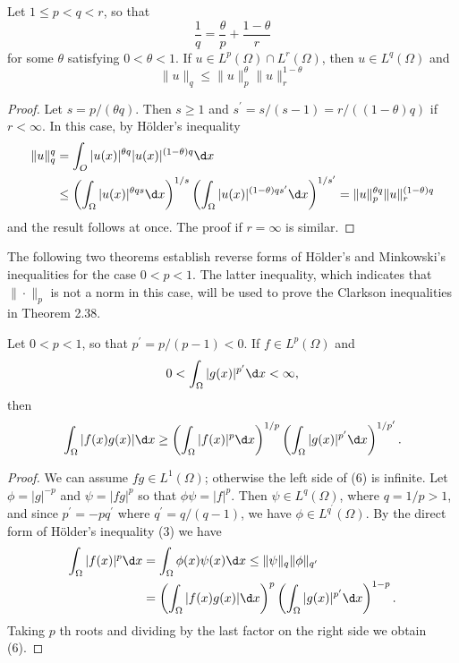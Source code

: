 \begin{theorem}
  Let $1 \leq p<q<r$, so that
  \[
  \frac{1}{q}=\frac{\theta}{p}+\frac{1-\theta}{r}
  \]
  for some $\theta$ satisfying $0<\theta<1$. If $u \in L^p(\Omega) \cap L^r(\Omega)$, then $u \in L^q(\Omega)$ and
  \[
  \|u\|_q \leq\|u\|_p^\theta\|u\|_r^{1-\theta}
  \]
\end{theorem}

\begin{proof}
  Let $s=p /(\theta q)$. Then $s \geq 1$ and $s^{\prime}=s /(s-1)=r /((1-\theta) q)$ if $r<\infty$. In this case, by Hölder's inequality
  \[
  \begin{aligned}
  \|u\|_q^q & =\int_O|u(x)|^{\theta q}|u(x)|^{(1-\theta) q} \d x \\
  & \leq\left(\int_{\Omega}|u(x)|^{\theta q s} \d x\right)^{1 / s}\left(\int_{\Omega}|u(x)|^{(1-\theta) q s^{\prime}} \d x\right)^{1 / s^{\prime}}=\|u\|_p^{\theta q}\|u\|_r^{(1-\theta) q}
  \end{aligned}
  \]
  and the result follows at once. The proof if $r=\infty$ is similar.
\end{proof}

The following two theorems establish reverse forms of Hölder's and Minkowski's inequalities for the case $0<p<1$. The latter inequality, which indicates that $\|\cdot\|_p$ is not a norm in this case, will be used to prove the Clarkson inequalities in Theorem 2.38.

\begin{theorem}
  Let $0<p<1$, so that $p^{\prime}=p /(p-1)<0$. If $f \in L^p(\Omega)$ and
  \[
  0<\int_{\Omega}|g(x)|^{p^{\prime}} \d x<\infty,
  \]
  then
  \begin{equation}\label{eq:2.6}
    \int_{\Omega}|f(x) g(x)| \d x \geq\left(\int_{\Omega}|f(x)|^p \d x\right)^{1 / p}\left(\int_{\Omega}|g(x)|^{p^{\prime}} \d x\right)^{1 / p^{\prime}}.
  \end{equation}
\end{theorem}

\begin{proof}
  We can assume $f g \in L^1(\Omega)$; otherwise the left side of (6) is infinite. Let $\phi=|g|^{-p}$ and $\psi=|f g|^p$ so that $\phi \psi=|f|^p$. Then $\psi \in L^q(\Omega)$, where $q=1 / p>1$, and since $p^{\prime}=-p q^{\prime}$ where $q^{\prime}=q /(q-1)$, we have $\phi \in L^{q^{\prime}}(\Omega)$. By the direct form of Hölder's inequality (3) we have
  \[
  \begin{aligned}
  \int_{\Omega}|f(x)|^p \d x & =\int_{\Omega} \phi(x) \psi(x) \d x \leq\|\psi\|_q\|\phi\|_{q^{\prime}} \\
  & =\left(\int_{\Omega}|f(x) g(x)| \d x\right)^p\left(\int_{\Omega}|g(x)|^{p^{\prime}} \d x\right)^{1-p} .
  \end{aligned}
  \]
  Taking $p$ th roots and dividing by the last factor on the right side we obtain (6).
\end{proof}



